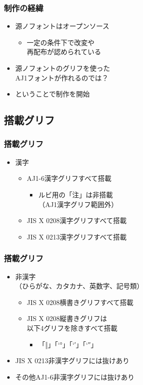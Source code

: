 \begin{frame}\frametitle{制作の経緯}
  \begin{itemize}
  \item 源ノフォントはオープンソース
    \begin{itemize}
    \item 一定の条件下で改変や \\
      再配布が認められている
    \end{itemize}
  \item 源ノフォントのグリフを使った \\
    AJ1フォントが作れるのでは？
  \item ということで制作を開始
  \end{itemize}
\end{frame}

\subsection{搭載グリフ}
\begin{frame}\frametitle{搭載グリフ}
  \begin{itemize}
  \item 漢字
    \begin{itemize}
    \item AJ1-6漢字グリフすべて搭載
      \begin{itemize}
      \item ルビ用の「注」は非搭載 \\
        （AJ1漢字グリフ範囲外）
      \end{itemize}
    \item JIS X 0208漢字グリフすべて搭載
    \item JIS X 0213漢字グリフすべて搭載
    \end{itemize}
  \end{itemize}
\end{frame}

\begin{frame}\frametitle{搭載グリフ}
  \begin{itemize}
  \item 非漢字 \\
    （ひらがな、カタカナ、英数字、記号類）
    \begin{itemize}
    \item JIS X 0208横書きグリフすべて搭載
    \item JIS X 0208縦書きグリフは \\
      以下4グリフを除きすべて搭載
      \begin{itemize}
      \item 「‖」「\ltjjachar`°」「\ltjjachar`′」「\ltjjachar`″」
      \end{itemize}
    \end{itemize}
  \item JIS X 0213非漢字グリフには抜けあり
  \item その他AJ1-6非漢字グリフには抜けあり
  \end{itemize}
\end{frame}

